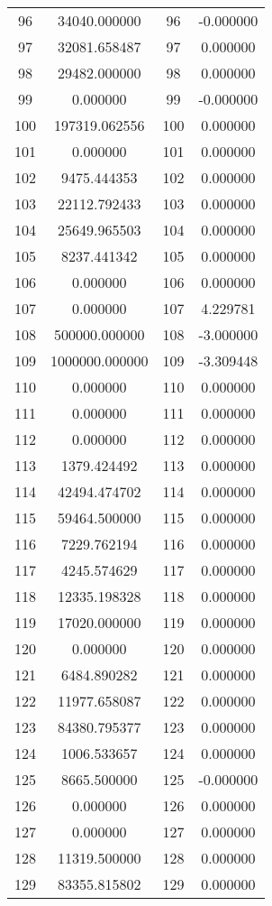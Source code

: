 \documentclass[12pt]{article}
\begin{document}
\begin{longtable}{@{}cccc@{}}
96 & 34040.000000 & 96 & -0.000000 \\
97 & 32081.658487 & 97 & 0.000000 \\
98 & 29482.000000 & 98 & 0.000000 \\
99 & 0.000000 & 99 & -0.000000 \\
100 & 197319.062556 & 100 & 0.000000 \\
101 & 0.000000 & 101 & 0.000000 \\
102 & 9475.444353 & 102 & 0.000000 \\
103 & 22112.792433 & 103 & 0.000000 \\
104 & 25649.965503 & 104 & 0.000000 \\
105 & 8237.441342 & 105 & 0.000000 \\
106 & 0.000000 & 106 & 0.000000 \\
107 & 0.000000 & 107 & 4.229781 \\
108 & 500000.000000 & 108 & -3.000000 \\
109 & 1000000.000000 & 109 & -3.309448 \\
110 & 0.000000 & 110 & 0.000000 \\
111 & 0.000000 & 111 & 0.000000 \\
112 & 0.000000 & 112 & 0.000000 \\
113 & 1379.424492 & 113 & 0.000000 \\
114 & 42494.474702 & 114 & 0.000000 \\
115 & 59464.500000 & 115 & 0.000000 \\
116 & 7229.762194 & 116 & 0.000000 \\
117 & 4245.574629 & 117 & 0.000000 \\
118 & 12335.198328 & 118 & 0.000000 \\
119 & 17020.000000 & 119 & 0.000000 \\
120 & 0.000000 & 120 & 0.000000 \\
121 & 6484.890282 & 121 & 0.000000 \\
122 & 11977.658087 & 122 & 0.000000 \\
123 & 84380.795377 & 123 & 0.000000 \\
124 & 1006.533657 & 124 & 0.000000 \\
125 & 8665.500000 & 125 & -0.000000 \\
126 & 0.000000 & 126 & 0.000000 \\
127 & 0.000000 & 127 & 0.000000 \\
128 & 11319.500000 & 128 & 0.000000 \\
129 & 83355.815802 & 129 & 0.000000 \\

\end{longtable}
\end{document}
